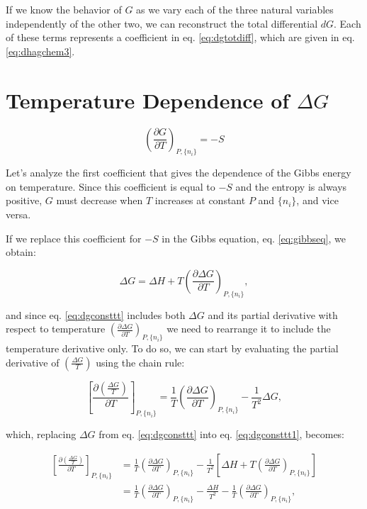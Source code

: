 \documentclass[
  9pt,
]{extbook}
\theoremstyle{definition}
\theoremstyle{definition}
\theoremstyle{definition}
\theoremstyle{definition}
\theoremstyle{remark}
\begin{document}
If we know the behavior of \(G\) as we vary each of the three natural variables independently of the other two, we can reconstruct the total differential \(dG\). Each of these terms represents a coefficient in eq. \eqref{eq:dgtotdiff}, which are given in eq. \eqref{eq:dhagchem3}.

\section{\texorpdfstring{Temperature Dependence of \(\Delta G\)}{Temperature Dependence of \textbackslash Delta G}}\label{temperature-dependence-of-delta-g}

\[
\left(\frac{\partial G}{\partial T} \right)_{P,\{n_i\}}=-S
\]

Let's analyze the first coefficient that gives the dependence of the Gibbs energy on temperature. Since this coefficient is equal to \(-S\) and the entropy is always positive, \(G\) must decrease when \(T\) increases at constant \(P\) and \(\{n_i\}\), and vice versa.

If we replace this coefficient for \(-S\) in the Gibbs equation, eq. \eqref{eq:gibbseq}, we obtain:

\begin{equation}
\Delta G = \Delta H + T \left(\frac{\partial \Delta G}{\partial T} \right)_{P,\{n_i\}},
\label{eq:dgconsttt}
\end{equation}

and since eq. \eqref{eq:dgconsttt} includes both \(\Delta G\) and its partial derivative with respect to temperature \(\left(\frac{\partial \Delta G}{\partial T} \right)_{P,\{n_i\}}\) we need to rearrange it to include the temperature derivative only. To do so, we can start by evaluating the partial derivative of \(\left( \frac{\Delta G}{T} \right)\) using the chain rule:

\begin{equation}
\left[ \frac{\partial\left( \frac{\Delta G}{T} \right)}{\partial T} \right]_{P,\{n_i\}} = \frac{1}{T} \left(\frac{\partial \Delta G}{\partial T}  \right)_{P,\{n_i\}} - \frac{1}{T^2}\Delta G,
\label{eq:dgconsttt1}
\end{equation}

which, replacing \(\Delta G\) from eq. \eqref{eq:dgconsttt} into eq. \eqref{eq:dgconsttt1}, becomes:

\begin{equation}
\begin{aligned}
\left[ \frac{\partial\left( \frac{\Delta G}{T} \right)}{\partial T} \right]_{P,\{n_i\}} &= \frac{1}{T} \left(\frac{\partial \Delta G}{\partial T}  \right)_{P,\{n_i\}} - \frac{1}{T^2} \left[ \Delta H + T \left(\frac{\partial \Delta G}{\partial T} \right)_{P,\{n_i\}} \right] \\
&= \frac{1}{T} \left(\frac{\partial \Delta G}{\partial T}  \right)_{P,\{n_i\}}- \frac{\Delta H}{T^2}-\frac{1}{T} \left(\frac{\partial \Delta G}{\partial T}  \right)_{P,\{n_i\}},
\end{aligned}
\label{eq:dgconsttt2}
\end{equation}
\end{document}
